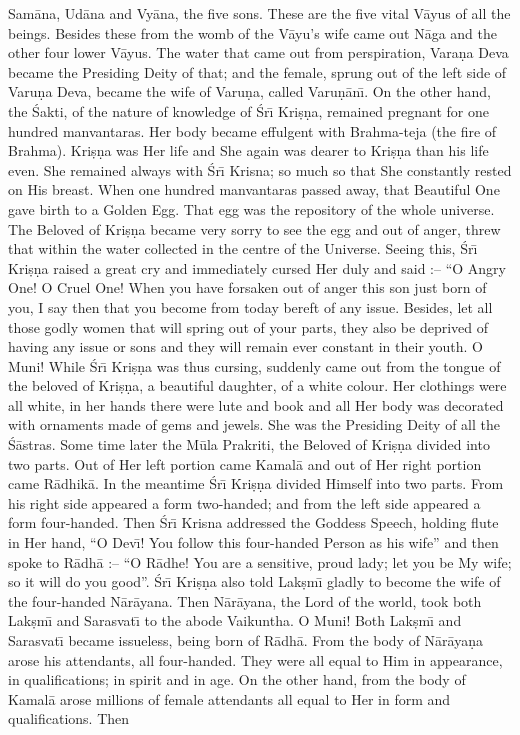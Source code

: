 Sam\=ana, Ud\=ana and Vy\=ana, the five sons. These are the five vital V\=ayus of all the beings. Besides these from the womb of the V\=ayu's wife came out N\=aga and the other four lower V\=ayus. The water that came out from perspiration, Vara\d{n}a Deva became the Presiding Deity of that; and the female, sprung out of the left side of Varu\d{n}a Deva, became the wife of Varu\d{n}a, called Varu\d{n}\=an\={\i}. On the other hand, the \'Sakti, of the nature of knowledge of \'Sr\={\i} Kri\d{s}\d{n}a, remained pregnant for one hundred manvantaras. Her body became effulgent with Brahma-teja (the fire of Brahma). Kri\d{s}\d{n}a was Her life and She again was dearer to Kri\d{s}\d{n}a than his life even. She remained always with \'Sr\={\i} Krisna; so much so that She constantly rested on His breast. When one hundred manvantaras passed away, that Beautiful One gave birth to a Golden Egg. That egg was the repository of the whole universe. The Beloved of Kri\d{s}\d{n}a became very sorry to see the egg and out of anger, threw that within the water collected in the centre of the Universe. Seeing this, \'Sr\={\i} Kri\d{s}\d{n}a raised a great cry and immediately cursed Her duly and said :-- ``O Angry One! O Cruel One! When you have forsaken out of anger this son just born of you, I say then that you become from today bereft of any issue. Besides, let all those godly women that will spring out of your parts, they also be deprived of having any issue or sons and they will remain ever constant in their youth. O Muni! While \'Sr\={\i} Kri\d{s}\d{n}a was thus cursing, suddenly came out from the tongue of the beloved of Kri\d{s}\d{n}a, a beautiful daughter, of a white colour. Her clothings were all white, in her hands there were lute and book and all Her body was decorated with ornaments made of gems and jewels. She was the Presiding Deity of all the \'S\=astras. Some time later the M\=ula Prakriti, the Beloved of Kri\d{s}\d{n}a divided into two parts. Out of Her left portion came Kamal\=a and out of Her right portion came R\=adhik\=a. In the meantime \'Sr\={\i} Kri\d{s}\d{n}a divided Himself into two parts. From his right side appeared a form two-handed; and from the left side appeared a form four-handed. Then \'Sr\={\i} Krisna addressed the Goddess Speech, holding flute in Her hand, ``O Dev\={\i}! You follow this four-handed Person as his wife'' and then spoke to R\=adh\=a :-- ``O R\=adhe! You are a sensitive, proud lady; let you be My wife; so it will do you good''. \'Sr\={\i} Kri\d{s}\d{n}a also told Lak\d{s}m\={\i} gladly to become the wife of the four-handed N\=ar\=ayana. Then N\=ar\=ayana, the Lord of the world, took both Lak\d{s}m\={\i} and Sarasvat\={\i} to the abode Vaikuntha. O Muni! Both Lak\d{s}m\={\i} and Sarasvat\={\i} became issueless, being born of R\=adh\=a. From the body of N\=ar\=aya\d{n}a arose his attendants, all four-handed. They were all equal to Him in appearance, in qualifications; in spirit and in age. On the other hand, from the body of Kamal\=a arose millions of female attendants all equal to Her in form and qualifications. Then

